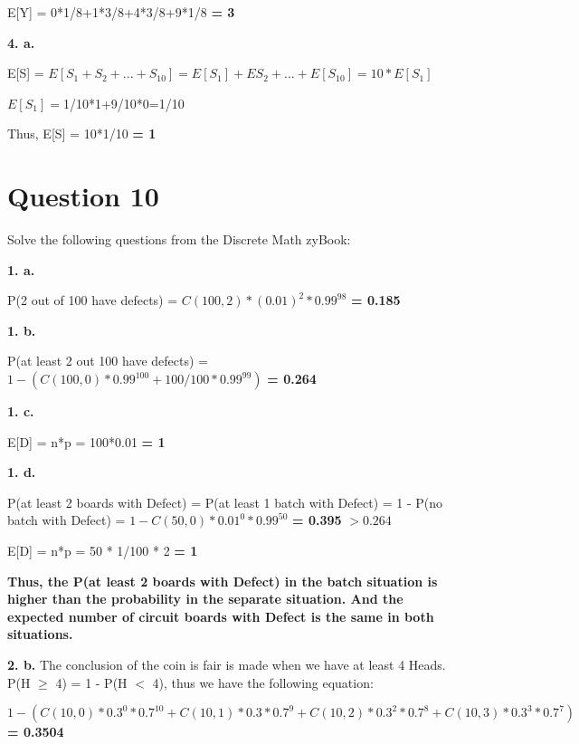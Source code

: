 \documentclass[11pt]{article}
\begin{document}
	E[Y] = 0*1/8+1*3/8+4*3/8+9*1/8 \textbf{= 3}
	
	\vspace{10mm}
	\textbf{4. a.}
	
	E[S] = $E[S_1+S_2+...+S_{10}]=E[S_1]+E{S_2}+...+E[S_{10}]=10*E[S_1]$
	
	$E[S_1]=$1/10*1+9/10*0=1/10
	
	Thus, E[S] = 10*1/10 \textbf{= 1}

	
	\newpage
	\section*{Question 10}
	Solve the following questions from the Discrete Math zyBook:
	
	\textbf{1. a.}
	
	P(2 out of 100 have defects) = $C(100,2)*(0.01)^2*0.99^{98}$ \textbf{= 0.185}
	

	\vspace{10mm}
	\textbf{1. b.}
	
	P(at least 2 out 100 have defects) = $1-(C(100,0)*0.99^{100}+100/100*0.99^{99})$ \textbf{= 0.264}
	
	\vspace{10mm}
	\textbf{1. c.}
	
	E[D] = n*p = 100*0.01 \textbf{= 1}
	
	\vspace{10mm}
	\textbf{1. d.}
	
	P(at least 2 boards with Defect) = P(at least 1 batch with Defect) = 1 - P(no batch with Defect) = $1-C(50,0)*0.01^0*0.99^{50}$ \textbf{= 0.395} $>0.264$
	
	E[D] = n*p = 50 * 1/100 * 2 \textbf{= 1}
	
	\textbf{Thus, the P(at least 2 boards with Defect) in the batch situation is higher than the probability in the separate situation. And the expected number of circuit boards with Defect is the same in both situations.}
	
	\vspace{10mm}
	\textbf{2. b.}
	The conclusion of the coin is fair is made when we have at least 4 Heads. P(H $\geq$ 4) = 1 - P(H $<$ 4), thus we have the following equation: 
	
	$1-(C(10,0)*0.3^0*0.7^{10}+C(10,1)*0.3*0.7^9+C(10,2)*0.3^2*0.7^8+C(10,3)*0.3^3*0.7^7)$ \textbf{= 0.3504}
	
	
\end{document}
